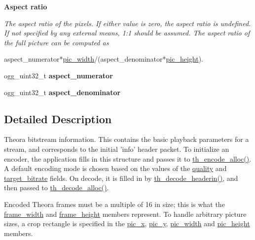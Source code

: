 \begin{Indent}{\bf Aspect ratio}\par
{\em The aspect ratio of the pixels. If either value is zero, the aspect ratio is undefined. If not specified by any external means, 1\+:1 should be assumed. The aspect ratio of the full picture can be computed as 
\begin{DoxyCode}
aspect\_numerator*\hyperlink{structth__info_a5048edf77b141dd3e9a92ca85e317345}{pic\_width}/(aspect\_denominator*\hyperlink{structth__info_a775178474283c5990ba73f9ba7f6b88b}{pic\_height}).
\end{DoxyCode}
 }\begin{DoxyCompactItemize}
\item 
\hypertarget{structth__info_a5be65dac9f75e37864cf73dd543570cd}{ogg\+\_\+uint32\+\_\+t {\bfseries aspect\+\_\+numerator}}\label{structth__info_a5be65dac9f75e37864cf73dd543570cd}

\item 
\hypertarget{structth__info_a04c0bd477222d747a76085d8720322e2}{ogg\+\_\+uint32\+\_\+t {\bfseries aspect\+\_\+denominator}}\label{structth__info_a04c0bd477222d747a76085d8720322e2}

\end{DoxyCompactItemize}
\end{Indent}


\subsection{Detailed Description}
Theora bitstream information. This contains the basic playback parameters for a stream, and corresponds to the initial 'info' header packet. To initialize an encoder, the application fills in this structure and passes it to \hyperlink{group__encfuncs_gaa91e47bc9dd5f6ee52045bd7b815e5a7}{th\+\_\+encode\+\_\+alloc()}. A default encoding mode is chosen based on the values of the \hyperlink{structth__info_aa4cdcf96cb46b256821993e9a830ee02}{quality} and \hyperlink{structth__info_a1d9c8d768a4ae623269f5bd8f6f7a015}{target\+\_\+bitrate} fields. On decode, it is filled in by \hyperlink{group__decfuncs_ga006d01d36fbe64768c571e6a12b7fc50}{th\+\_\+decode\+\_\+headerin()}, and then passed to \hyperlink{group__decfuncs_ga0ef07a9a97849054aa606c595a2d807e}{th\+\_\+decode\+\_\+alloc()}.

Encoded Theora frames must be a multiple of 16 in size; this is what the \hyperlink{structth__info_a6b8087a4d831da53011a43b8d74087a0}{frame\+\_\+width} and \hyperlink{structth__info_a6b1adc3a16a8336a72692b0a5937214c}{frame\+\_\+height} members represent. To handle arbitrary picture sizes, a crop rectangle is specified in the \hyperlink{structth__info_a5b3f834bcf141564e7bb14f49101870f}{pic\+\_\+x}, \hyperlink{structth__info_a8aacc575cab2dfe3735001c2ad32aa14}{pic\+\_\+y}, \hyperlink{structth__info_a5048edf77b141dd3e9a92ca85e317345}{pic\+\_\+width} and \hyperlink{structth__info_a775178474283c5990ba73f9ba7f6b88b}{pic\+\_\+height} members.

